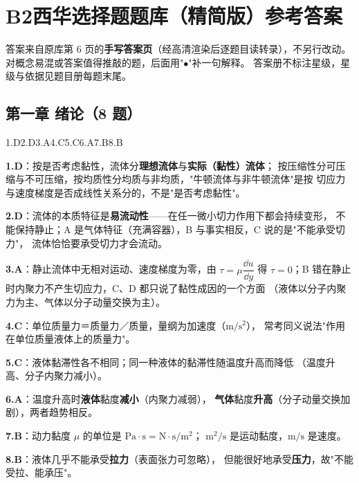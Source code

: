 \chapter*{B2\quad 西华选择题题库（精简版）参考答案}

\begin{tishi}
答案来自原库第 6 页的\textbf{手写答案页}（经高清渲染后逐题目读转录），不另行改动。
对概念易混或答案值得推敲的题，后面用"$\bullet$"补一句解释。
答案册不标注星级，星级与依据见题目册每题末尾。
\end{tishi}

\section*{第一章 绪论（8 题）}

\noindent 1.D\quad 2.D\quad 3.A\quad 4.C\quad 5.C\quad 6.A\quad 7.B\quad 8.B

\begin{tishi}
\begin{xiaowen}
\item \textbf{1.D}：按是否考虑黏性，流体分\textbf{理想流体}与\textbf{实际（黏性）流体}；
按压缩性分可压缩与不可压缩，按均质性分均质与非均质，"牛顿流体与非牛顿流体"是按
切应力与速度梯度是否成线性关系分的，不是"是否考虑黏性"。
\item \textbf{2.D}：流体的本质特征是\textbf{易流动性}——在任一微小切力作用下都会持续变形，
不能保持静止；A 是气体特征（充满容器），B 与事实相反，C 说的是"不能承受切力"，
流体恰恰要承受切力才会流动。
\item \textbf{3.A}：静止流体中无相对运动、速度梯度为零，由 $\tau=\mu\dfrac{\dd u}{\dd y}$ 得
$\tau=0$；B 错在静止时内聚力不产生切应力，C、D 都只说了黏性成因的一个方面
（液体以分子内聚力为主、气体以分子动量交换为主）。
\item \textbf{4.C}：单位质量力＝质量力／质量，量纲为加速度（$\mathrm{m/s^2}$），
常考同义说法"作用在单位质量液体上的质量力"。
\item \textbf{5.C}：液体黏滞性各不相同；同一种液体的黏滞性随温度升高而降低
（温度升高、分子内聚力减小）。
\item \textbf{6.A}：温度升高时\textbf{液体}黏度\textbf{减小}（内聚力减弱），
\textbf{气体}黏度\textbf{升高}（分子动量交换加剧），两者趋势相反。
\item \textbf{7.B}：动力黏度 $\mu$ 的单位是 $\mathrm{Pa\cdot s}=\mathrm{N\cdot s/m^2}$；
$\mathrm{m^2/s}$ 是运动黏度，$\mathrm{m/s}$ 是速度。
\item \textbf{8.B}：液体几乎不能承受\textbf{拉力}（表面张力可忽略），
但能很好地承受\textbf{压力}，故"不能受拉、能承压"。
\end{xiaowen}
\end{tishi}

